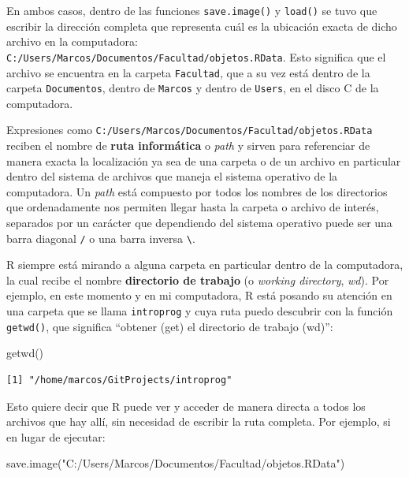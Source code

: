 \documentclass[
]{book}
\newenvironment{Shaded}{\begin{snugshade}}{\end{snugshade}}
\newcommand{\FunctionTok}[1]{\textcolor[rgb]{0.00,0.00,0.00}{#1}}
\newcommand{\NormalTok}[1]{#1}
\newcommand{\StringTok}[1]{\textcolor[rgb]{0.31,0.60,0.02}{#1}}
\begin{document}
En ambos casos, dentro de las funciones \texttt{save.image()} y \texttt{load()} se tuvo que escribir la dirección completa que representa cuál es la ubicación exacta de dicho archivo en la computadora: \texttt{C:/Users/Marcos/Documentos/Facultad/objetos.RData}. Esto significa que el archivo se encuentra en la carpeta \texttt{Facultad}, que a su vez está dentro de la carpeta \texttt{Documentos}, dentro de \texttt{Marcos} y dentro de \texttt{Users}, en el disco C de la computadora.

Expresiones como \texttt{C:/Users/Marcos/Documentos/Facultad/objetos.RData} reciben el nombre de \textbf{ruta informática} o \emph{path} y sirven para referenciar de manera exacta la localización ya sea de una carpeta o de un archivo en particular dentro del sistema de archivos que maneja el sistema operativo de la computadora. Un \emph{path} está compuesto por todos los nombres de los directorios que ordenadamente nos permiten llegar hasta la carpeta o archivo de interés, separados por un carácter que dependiendo del sistema operativo puede ser una barra diagonal \texttt{/} o una barra inversa \texttt{\textbackslash{}}.

R siempre está mirando a alguna carpeta en particular dentro de la computadora, la cual recibe el nombre \textbf{directorio de trabajo} (o \emph{working directory}, \emph{wd}). Por ejemplo, en este momento y en mi computadora, R está posando su atención en una carpeta que se llama \texttt{introprog} y cuya ruta puedo descubrir con la función \texttt{getwd()}, que significa ``obtener (get) el directorio de trabajo (wd)'':

\begin{Shaded}
\begin{Highlighting}[]
\FunctionTok{getwd}\NormalTok{()}
\end{Highlighting}
\end{Shaded}

\begin{verbatim}
[1] "/home/marcos/GitProjects/introprog"
\end{verbatim}

Esto quiere decir que R puede ver y acceder de manera directa a todos los archivos que hay allí, sin necesidad de escribir la ruta completa. Por ejemplo, si en lugar de ejecutar:

\begin{Shaded}
\begin{Highlighting}[]
\FunctionTok{save.image}\NormalTok{(}\StringTok{"C:/Users/Marcos/Documentos/Facultad/objetos.RData"}\NormalTok{)}
\end{Highlighting}
\end{Shaded}
\end{document}
